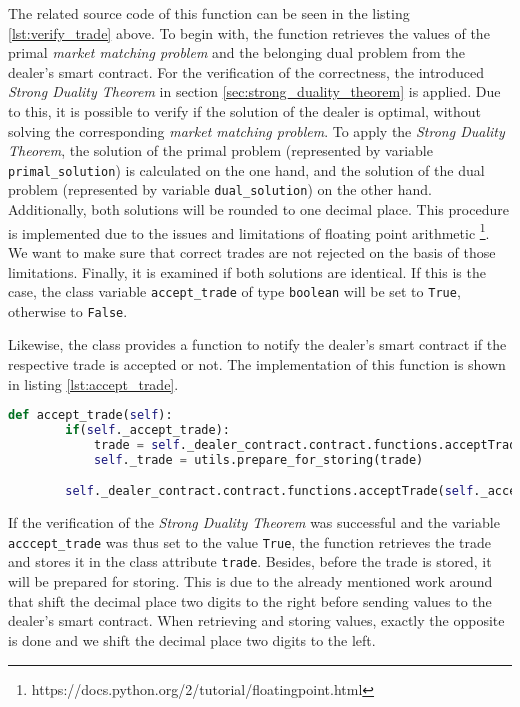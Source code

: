The related source code of this function can be seen in the listing \ref{lst:verify_trade} above. 
To begin with, the function retrieves the values of the primal \textit{market matching problem} and
the belonging dual problem from the dealer's smart contract. For the verification of the correctness, the introduced \textit{Strong Duality Theorem}
in section \ref{sec:strong_duality_theorem} is applied. 
Due to this, it is possible to verify if the solution of the dealer is optimal, without solving the corresponding
\textit{market matching problem}.
To apply the \textit{Strong Duality Theorem}, the solution of the primal problem (represented by variable \verb|primal_solution|) is calculated
on the one hand, and the solution of the dual problem (represented by variable \verb|dual_solution|) on the other hand.
Additionally, both solutions will be rounded to one decimal place. This procedure is implemented due to the issues and limitations of 
floating point arithmetic \footnote{https://docs.python.org/2/tutorial/floatingpoint.html}. 
We want to make sure that correct trades are not rejected on the basis of those limitations.
Finally, it is examined if both solutions are identical. If this is the case, the class variable \verb|accept_trade| of type \verb|boolean| will be
set to \verb|True|, otherwise to \verb|False|.

Likewise, the class provides a function to notify the dealer's smart contract if the respective trade is accepted or not.
The implementation of this function is shown in listing \ref{lst:accept_trade}.

\begin{lstlisting}[float=htbp, label=lst:accept_trade, caption=Notification of trade acceptance, language=Python]
    def accept_trade(self):
        if(self._accept_trade):
            trade = self._dealer_contract.contract.functions.acceptTrade(self._accept_trade).call({'from': self._account_address})
            self._trade = utils.prepare_for_storing(trade)

        self._dealer_contract.contract.functions.acceptTrade(self._accept_trade).transact({'from': self._account_address})

\end{lstlisting}

If the verification of the \textit{Strong Duality Theorem} was successful and the variable \verb|acccept_trade| was thus set to the value \verb|True|,
the function retrieves the trade and stores it in the class attribute \verb|trade|. Besides, before the trade is stored, it will be 
prepared for storing. This is due to the already mentioned work around that shift the decimal place two digits to the right before 
sending values to the dealer's smart contract. When retrieving and storing values, exactly the opposite is done and we shift the decimal place 
two digits to the left. 

